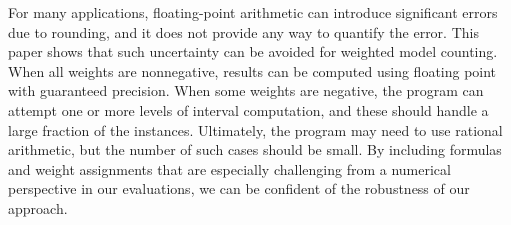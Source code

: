 \documentclass{easychair}
\begin{document}
For many applications, floating-point arithmetic can introduce
significant errors due to rounding, and it does not provide any way to
quantify the error.  This paper shows that such uncertainty can be
avoided for weighted model counting.  When all weights are
nonnegative, results can be computed using floating point with
guaranteed precision.  When some weights are negative, the program can
attempt one or more levels of interval computation, and these should
handle a large fraction of the instances.  Ultimately, the program may
need to use rational arithmetic, but the number of such cases should
be small.  By including formulas and weight assignments that are
especially challenging from a numerical perspective in our evaluations, we can be confident
of the robustness of our approach.


\end{document}
